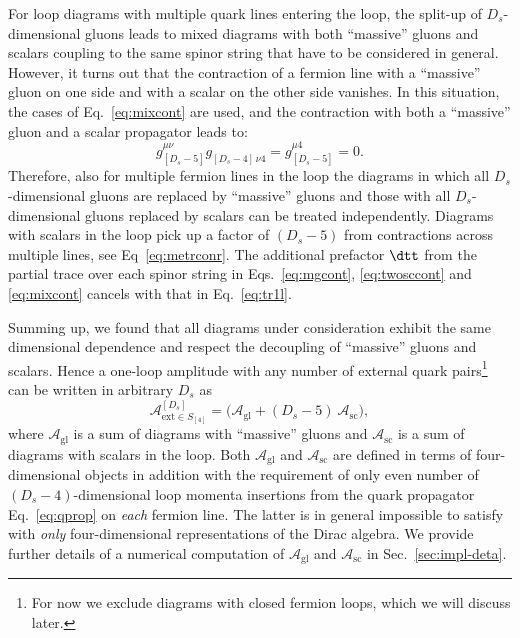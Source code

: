 For loop diagrams with multiple quark lines entering the loop, the
split-up of $D_s$-dimensional gluons leads to mixed diagrams with both
``massive'' gluons and scalars coupling to the same spinor string that have to be considered in general. However, it turns out that the contraction of a fermion line with a ``massive'' gluon on one side and
with a scalar on the other side vanishes. In this situation, the cases
of Eq.~\eqref{eq:mixcont} are used, and the contraction with both a
``massive'' gluon and a scalar propagator leads to:
\begin{equation}
  g_{[D_s-5]}^{\mu \nu  } g_{[D_s-4]\, \nu 4}^{\phantom{\mu}} = g_{[D_s-5]}^{\mu 4} = 0.
\end{equation}
Therefore, also for multiple fermion lines in the loop the diagrams in which all $D_s$-dimensional gluons are replaced by
``massive'' gluons and those with all $D_s$-dimensional
gluons replaced by scalars can be treated independently. Diagrams with scalars
in the loop pick up a factor of $(D_s-5)$ from contractions across
multiple lines, see Eq~\eqref{eq:metrconr}. The additional prefactor
$\dtt$ from the partial trace over each spinor string in
Eqs.~\eqref{eq:mgcont}, \eqref{eq:twosccont} and \eqref{eq:mixcont} cancels with that
in Eq.~\eqref{eq:tr1l}.

Summing up, we found that all diagrams under consideration exhibit the same dimensional dependence and respect the decoupling of ``massive'' gluons and scalars.
Hence a one-loop amplitude with any number of external quark pairs\footnote{For now we exclude diagrams with closed fermion loops,
  which we will discuss later.} can be written in arbitrary $D_s$ as
\begin{equation} 
  \mathcal{A}^{[D_s]}_{\text{ext}\in S_{[4]}} =\Big( \mathcal{A}_{\text{gl}} + (D_s-5)~\mathcal{A}_{\text{sc}}\Big),
  \label{eq:ddependence}
\end{equation}
where $\mathcal{A}_{\text{gl}}$ is a sum of diagrams with ``massive''
gluons and $\mathcal{A}_{\text{sc}}$ is a sum of diagrams with
scalars in the loop. Both $\mathcal{A}_{\text{gl}}$ and
$\mathcal{A}_{\text{sc}}$ are defined in terms of four-dimensional
objects in addition with the requirement of only even number of $(D_s-4)$-dimensional loop momenta insertions from the quark propagator Eq.~\eqref{eq:qprop} on \emph{each}
fermion line. The latter is in general impossible to satisfy with \emph{only} four-dimensional representations of the Dirac
algebra. We provide further details of a numerical computation of
$\mathcal{A}_{\text{gl}}$ and $\mathcal{A}_{\text{sc}}$ in Sec.~\ref{sec:impl-deta}.

